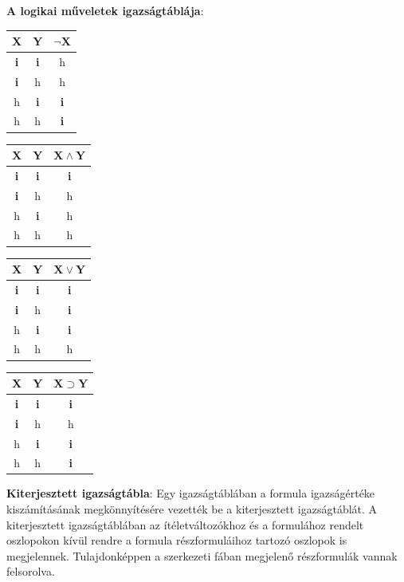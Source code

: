 \documentclass[tikz,12pt,margin=0px]{article}
\begin{document}
	\noindent \textbf{A logikai műveletek igazságtáblája}:

    \begin{center}	
    	\begin{tabular}{|c|c||c|}
            \hline
    		\textbf{X} & \textbf{Y} & $\boldsymbol{\neg X}$  \\ \hline
    		\textbf{i} & \textbf{i} & h \\ \hline
    		\textbf{i} & h & h  \\ \hline
    		h & \textbf{i} & \textbf{i} \\ \hline
    		h & h & \textbf{i} \\ \hline
    	\end{tabular}\quad
    	\begin{tabular}{|c|c||c|}
            \hline
    		\textbf{X} & \textbf{Y} & $\boldsymbol{X \wedge Y}$   \\ \hline
    		\textbf{i} & \textbf{i} & \textbf{i} \\ \hline
    		\textbf{i} & h & h \\ \hline
    		h & \textbf{i} & h  \\ \hline
    		h & h & h \\ \hline
    	\end{tabular}\quad
    	\begin{tabular}{|c|c||c|}
            \hline
    		\textbf{X} & \textbf{Y} & $\boldsymbol{X \vee Y}$  \\ \hline
    		\textbf{i} & \textbf{i} & \textbf{i} \\ \hline
    		\textbf{i} & h & \textbf{i}  \\ \hline
    		h & \textbf{i} & \textbf{i} \\ \hline
    		h & h & h \\ \hline
    	\end{tabular}\quad
    	\begin{tabular}{|c|c||c|}
            \hline
    		\textbf{X} & \textbf{Y} & $\boldsymbol{X \supset Y}$  \\ \hline
    		\textbf{i} & \textbf{i} & \textbf{i} \\ \hline
    		\textbf{i} & h & h  \\ \hline
    		h & \textbf{i} & \textbf{i} \\ \hline
    		h & h & \textbf{i} \\ \hline
    	\end{tabular}
    \end{center}
	
	\noindent \textbf{Kiterjesztett igazságtábla}: Egy igazságtáblában a formula igazságértéke kiszámításának megkönnyítésére vezették
	be a kiterjesztett igazságtáblát. A kiterjesztett igazságtáblában az ítéletváltozókhoz és a formulához rendelt oszlopokon kívül rendre
	a formula részformuláihoz tartozó oszlopok is megjelennek. Tulajdonképpen a szerkezeti fában megjelenő részformulák vannak felsorolva.
	
\end{document}
